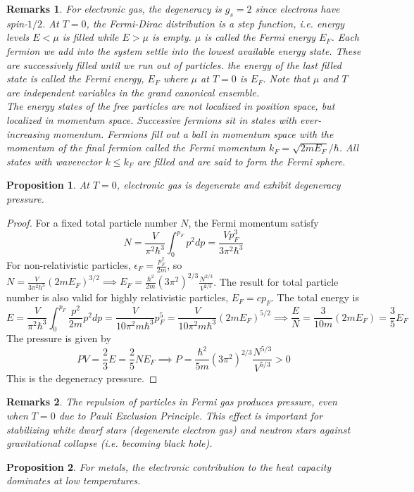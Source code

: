 \documentclass[a4paper]{article}
\newtheorem{remarks}{Remarks}[section]
\theoremstyle{new}
\newtheorem{prop}{Proposition}[section]
\begin{document}
\begin{remarks}
For electronic gas, the degeneracy is $g_s=2$ since electrons have spin-$1/2$. At $T=0$, the Fermi-Dirac distribution is a step function, i.e. energy levels $E<\mu$ is filled while $E>\mu$ is empty. $\mu$ is called the Fermi energy $E_F$. Each fermion we add into the system settle into the lowest available energy state. These are successively filled until we run out of particles. the energy of the last filled state is called the Fermi energy, $E_F$ where $\mu$ at $T=0$ is $E_F$. Note that $\mu$ and $T$ are independent variables in the grand canonical ensemble.\\[5pt]
The energy states of the free particles are not localized in position space, but localized in momentum space. Successive fermions sit in states with ever-increasing momentum. Fermions fill out a ball in momentum space with the momentum of the final fermion called the Fermi momentum $k_F=\sqrt{2mE_F}/\hbar$. All states with wavevector $k\leq k_F$ are filled and are said to form the Fermi sphere.
\end{remarks}
\begin{prop}
At $T=0$, electronic gas is degenerate and exhibit degeneracy pressure.
\end{prop}
\begin{proof}
For a fixed total particle number $N$, the Fermi momentum satisfy
$$N=\frac{V}{\pi^2\hbar^3}\int_0^{p_F}p^2dp=\frac{Vp_F^3}{3\pi^2\hbar^3}$$
For non-relativistic particles, $\epsilon_F=\frac{p_F^2}{2m}$, so $N=\frac{V}{3\pi^2 h^3}(2mE_F)^{3/2}\implies E_F=\frac{\hbar^2}{2m}(3\pi^2)^{2/3}\frac{N^{2/3}}{V^{2/3}}$. The result for total particle number is also valid for highly relativistic particles, $E_F=cp_F$. The total energy is
$$E=\frac{V}{\pi^2\hbar^3}\int_0^{p_F}\frac{p^2}{2m}p^2dp=\frac{V}{10\pi^2m\hbar^3}p_F^5=\frac{V}{10\pi^2m\hbar^3}(2mE_F)^{5/2}\implies\frac{E}{N}=\frac{3}{10m}(2mE_F)=\frac{3}{5}E_F$$
The pressure is given by $$PV=\frac{2}{3}E=\frac{2}{5}NE_F\implies P=\frac{\hbar^2}{5m}(3\pi^2)^{2/3}\frac{N^{5/3}}{V^{5/3}}>0$$ 
This is the degeneracy pressure.
\end{proof}
\begin{remarks}
The repulsion of particles in Fermi gas produces pressure, even when $T=0$ due to Pauli Exclusion Principle. This effect is important for stabilizing white dwarf stars (degenerate electron gas) and neutron stars against gravitational collapse (i.e. becoming black hole).
\end{remarks}
\begin{prop}
For metals, the electronic contribution to the heat capacity dominates at low temperatures.
\end{prop}
\end{document}
